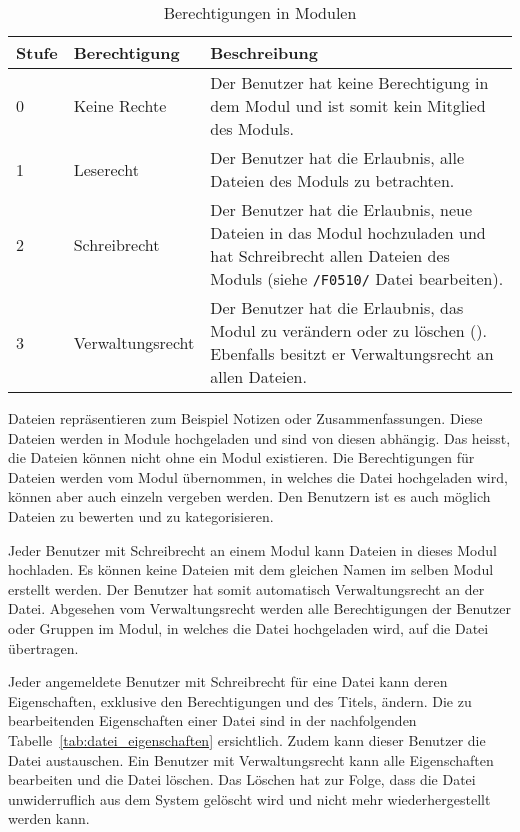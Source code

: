 \begin{table}[H]
\begin{tabularx}{\textwidth}{|l|l|X|} \hline
\textbf{Stufe} & \textbf{Berechtigung}     & \textbf{Beschreibung} \\ \hline
0     & Keine Rechte     & Der Benutzer hat keine Berechtigung in dem Modul und ist somit kein Mitglied des Moduls.\\ \hline
1     & Leserecht        & Der Benutzer hat die Erlaubnis, alle Dateien des Moduls zu betrachten.\\ \hline
2     & Schreibrecht     & Der Benutzer hat die Erlaubnis, neue Dateien in das Modul hochzuladen und hat Schreibrecht allen Dateien des Moduls (siehe \texttt{/F0510/} Datei bearbeiten).\\ \hline
3     & Verwaltungsrecht & Der Benutzer hat die Erlaubnis, das Modul zu verändern oder zu löschen ({Modul bearbeiten}). Ebenfalls besitzt er Verwaltungsrecht an allen Dateien. \\ \hline
\end{tabularx}
\caption{Berechtigungen in Modulen}
\label{tab:modul_rechte}
\end{table}
Dateien repräsentieren zum Beispiel Notizen oder Zusammenfassungen. Diese Dateien werden in Module hochgeladen und sind von diesen abhängig. Das heisst, die Dateien können nicht ohne ein Modul existieren. Die Berechtigungen für Dateien werden vom Modul übernommen, in welches die Datei hochgeladen wird, können aber auch einzeln vergeben werden. Den Benutzern ist es auch möglich Dateien zu bewerten und zu kategorisieren.

Jeder Benutzer mit Schreibrecht an einem Modul kann Dateien in dieses Modul hochladen. Es können keine Dateien mit dem gleichen Namen im selben Modul erstellt werden. Der Benutzer hat somit automatisch Verwaltungsrecht an der Datei. Abgesehen vom Verwaltungsrecht werden alle Berechtigungen der Benutzer oder Gruppen im Modul, in welches die Datei hochgeladen wird, auf die Datei übertragen.

Jeder angemeldete Benutzer mit Schreibrecht für eine Datei kann deren Eigenschaften, exklusive den Berechtigungen und des Titels, ändern. Die zu bearbeitenden Eigenschaften einer Datei sind in der nachfolgenden Tabelle~\ref{tab:datei_eigenschaften} ersichtlich. Zudem kann dieser Benutzer die Datei austauschen. Ein Benutzer mit Verwaltungsrecht kann alle Eigenschaften bearbeiten und die Datei löschen. Das Löschen hat zur Folge, dass die Datei unwiderruflich aus dem System gelöscht wird und nicht mehr wiederhergestellt werden kann.

